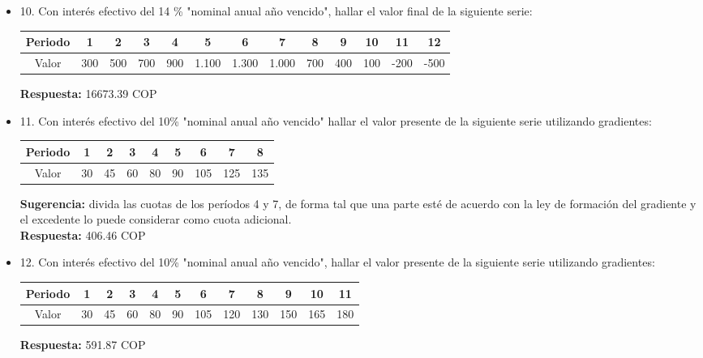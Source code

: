 \begin{itemize}
 \item 10. Con interés efectivo del 14 \% "nominal anual año vencido", hallar el valor final de la siguiente serie:\\
      \begin{center}
            \begin{tabular}{|c|c|c|c|c|c|c|c|c|c|c|c|c|}
            \hline
            Periodo & 1 & 2 & 3 & 4 & 5 & 6 & 7 & 8 & 9 & 10 & 11 & 12 \\ \hline
            Valor & 300 & 500 & 700 & 900 & 1.100 & 1.300 & 1.000 & 700 & 400 & 100 & -200 & -500 \\ \hline
            \end{tabular}
      \end{center}
       \textbf{Respuesta:}  16673.39 COP\\
       \medskip

 \item 11. Con interés efectivo del 10\% "nominal anual año vencido" hallar el valor presente de la siguiente serie utilizando gradientes:
      \begin{center}
            \begin{tabular}{|c|c|c|c|c|c|c|c|c|}
            \hline
            Periodo & 1 & 2 & 3 & 4 & 5 & 6 & 7 & 8 \\ \hline
            Valor & 30 & 45 & 60 & 80 & 90 & 105 & 125 & 135 \\ \hline
            \end{tabular}
      \end{center}
       \textbf{Sugerencia:} divida las cuotas de los períodos 4 y 7, de forma tal que una parte esté de acuerdo con la ley de formación del gradiente y el excedente lo puede considerar como cuota adicional.\\
       \textbf{Respuesta:}  406.46 COP\
       \medskip

 \item 12. Con interés efectivo del 10\% "nominal anual año vencido", hallar el valor presente de la siguiente serie utilizando gradientes:\\
      \begin{center}
            \begin{tabular}{|c|c|c|c|c|c|c|c|c|c|c|c|}
            \hline
            Periodo & 1 & 2 & 3 & 4 & 5 & 6 & 7 & 8 & 9 & 10 & 11 \\ \hline
            Valor & 30 & 45 & 60 & 80 & 90 & 105 & 120 & 130 & 150 & 165 & 180 \\ \hline
            \end{tabular}
      \end{center}
       \textbf{Respuesta:}  591.87 COP\\
       \medskip


\end{itemize}
